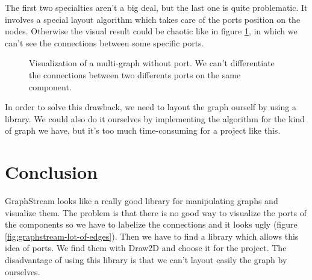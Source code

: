 The first two specialties aren't a big deal, but the last one is quite
problematic. It involves a special layout algorithm which takes care of the ports
position on the nodes. Otherwise the visual result could be chaotic like in
figure \ref{fig:multigraph-no-port}, in which we can't see the connections
between some specific ports.

\begin{figure}[H]
  \centering
  \caption[Visualization of a multi-graph without port]{Visualization of a
    multi-graph without port. We can't differentiate the connections between two
  differents ports on the same component.}
  \label{fig:multigraph-no-port}
\end{figure}

In order to solve this drawback, we need to layout the graph ourself by using a
library. We could also do it ourselves by implementing the algorithm for the kind
of graph we have, but it's too much time-consuming for a project like this.

\section{Conclusion}
\label{sec:viewing-library-conclusion}

GraphStream looks like a really good library for manipulating graphs and visualize
them. The problem is that there is no good way to visualize the ports of the
components so we have to labelize the connections and it looks ugly (figure
\ref{fig:graphstream-lot-of-edges}). Then we have to find a library which allows
this idea of ports. We find them with Draw2D and choose it for the project. The
disadvantage of using this library is that we can't layout easily the graph by
ourselves.

